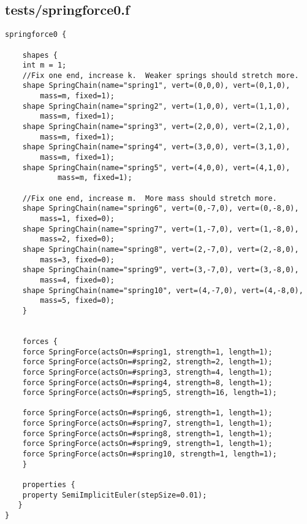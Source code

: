 \subsection*{tests/springforce0.f}
\begin{lstlisting}
springforce0 {

    shapes {
	int m = 1;
	//Fix one end, increase k.  Weaker springs should stretch more.
	shape SpringChain(name="spring1", vert=(0,0,0), vert=(0,1,0),
		mass=m, fixed=1);
	shape SpringChain(name="spring2", vert=(1,0,0), vert=(1,1,0),
		mass=m, fixed=1);
	shape SpringChain(name="spring3", vert=(2,0,0), vert=(2,1,0),
		mass=m, fixed=1);
	shape SpringChain(name="spring4", vert=(3,0,0), vert=(3,1,0),
		mass=m, fixed=1);
	shape SpringChain(name="spring5", vert=(4,0,0), vert=(4,1,0),
			mass=m, fixed=1);

	//Fix one end, increase m.  More mass should stretch more.
	shape SpringChain(name="spring6", vert=(0,-7,0), vert=(0,-8,0),
		mass=1, fixed=0);
	shape SpringChain(name="spring7", vert=(1,-7,0), vert=(1,-8,0),
		mass=2, fixed=0);
	shape SpringChain(name="spring8", vert=(2,-7,0), vert=(2,-8,0),
		mass=3, fixed=0);
	shape SpringChain(name="spring9", vert=(3,-7,0), vert=(3,-8,0),
		mass=4, fixed=0);
	shape SpringChain(name="spring10", vert=(4,-7,0), vert=(4,-8,0),
		mass=5, fixed=0);
    }


    forces {
	force SpringForce(actsOn=#spring1, strength=1, length=1);
	force SpringForce(actsOn=#spring2, strength=2, length=1);
	force SpringForce(actsOn=#spring3, strength=4, length=1);
	force SpringForce(actsOn=#spring4, strength=8, length=1);
	force SpringForce(actsOn=#spring5, strength=16, length=1);

	force SpringForce(actsOn=#spring6, strength=1, length=1);
	force SpringForce(actsOn=#spring7, strength=1, length=1);
	force SpringForce(actsOn=#spring8, strength=1, length=1);
	force SpringForce(actsOn=#spring9, strength=1, length=1);
	force SpringForce(actsOn=#spring10, strength=1, length=1);
    }

    properties { 
	property SemiImplicitEuler(stepSize=0.01);
   }
}
\end{lstlisting}

